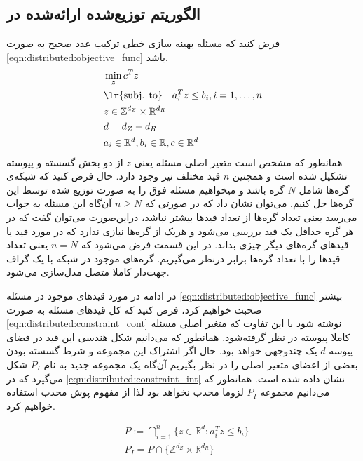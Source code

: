 \subsection{الگوریتم توزیع‌شده ارائه‌شده در \cite{testa2019distributed}}
فرض کنید که مسئله بهینه سازی خطی ترکیب عدد صحیح به صورت \cref{eqn:distributed:objective_func} باشد.
\begin{subequations}\label{eqn:distributed:objective_func}
	\begin{align}
		&\min_{z}c^Tz  \\
		&\text{\lr{subj. to}} \quad a_i^Tz \le b_i, i = 1, \dots, n  \\
		&z \in \mathbb{Z}^{d_Z} \times \mathbb{R}^{d_R} \\
		&d = d_Z + d_R  \\
		&a_i \in \mathbb{R}^d , b_i \in \mathbb{R}, c \in \mathbb{R}^d
	\end{align}
\end{subequations}
	همانطور که مشخص است متغیر اصلی مسئله یعنی $z$ از دو بخش گسسته و پیوسته تشکیل شده است و همچنین $n$ قید مختلف نیز وجود دارد. حال فرض کنید که شبکه‌ی گره‌ها شامل $N$ گره باشد و میخواهیم مسئله فوق را به صورت توزیع شده توسط این گره‌ها حل کنیم. می‌توان نشان داد که در صورتی که $n \ge N$ آن‌گاه این مسئله به جواب می‌رسد یعنی تعداد گره‌ها از تعداد قیدها بیشتر نباشد، دراین‌صورت می‌توان گفت که در هر گره حداقل یک قید بررسی می‌شود و هریک از گره‌ها نیازی ندارد که در مورد قید یا قیدهای گره‌های دیگر چیزی بداند. در این  قسمت فرض می‌شود که $n = N$ یعنی تعداد قیدها را با تعداد گره‌ها برابر درنظر می‌گیریم. 
	گره‌های موجود در شبکه با یک گراف جهت‌دار کاملا متصل مدل‌سازی می‌شود. 
	
	در ادامه در مورد قیدهای موجود در مسئله \cref{eqn:distributed:objective_func} بیشتر صحبت خواهیم کرد، فرض کنید که کل قیدهای مسئله به صورت \cref{eqn:distributed:constraint_cont} نوشته شود با این تفاوت که متغیر اصلی مسئله کاملا پیوسته در نظر گرفته‌شود. همانطور که می‌دانیم شکل هندسی این قید در فضای پیوسه $d$ یک چندوجهی خواهد بود. حال اگر اشتراک این مجموعه و شرط گسسته بودن بعضی از اعضای متغیر اصلی را در نظر بگیریم آن‌گاه یک مجموعه جدید به نام $P_I$ شکل می‌گیرد که در \cref{eqn:distributed:constraint_int} نشان داده شده است. همانطور که می‌دانیم مجموعه $P_I$ لزوما محدب نخواهد بود لذا از مفهوم پوش محدب استفاده خواهیم کرد. 
	
\begin{align}
	&P := \bigcap_{i=1}^n \{ z \in \mathbb{R}^d : a_i^Tz \le b_i\} \label{eqn:distributed:constraint_cont} \\
	&P_I = P \cap \{\mathbb{Z}^{d_Z} \times \mathbb{R}^{d_R}\} \label{eqn:distributed:constraint_int}
\end{align}	

